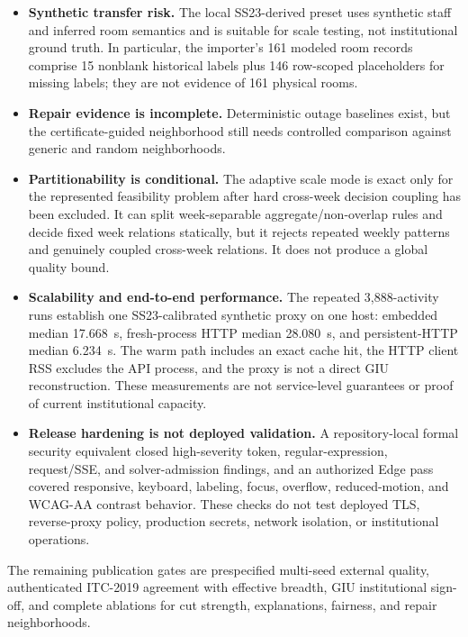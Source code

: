 \begin{itemize}[leftmargin=*]
  \item \textbf{Synthetic transfer risk.} The local SS23-derived preset uses synthetic staff and inferred room semantics and is suitable for scale testing, not institutional ground truth. In particular, the importer's 161 modeled room records comprise 15 nonblank historical labels plus 146 row-scoped placeholders for missing labels; they are not evidence of 161 physical rooms.
  \item \textbf{Repair evidence is incomplete.} Deterministic outage baselines exist, but the certificate-guided neighborhood still needs controlled comparison against generic and random neighborhoods.
  \item \textbf{Partitionability is conditional.} The adaptive scale mode is exact only for the represented feasibility problem after hard cross-week decision coupling has been excluded. It can split week-separable aggregate/non-overlap rules and decide fixed week relations statically, but it rejects repeated weekly patterns and genuinely coupled cross-week relations. It does not produce a global quality bound.
  \item \textbf{Scalability and end-to-end performance.} The repeated 3,888-activity runs establish one SS23-calibrated synthetic proxy on one host: embedded median 17.668~s, fresh-process HTTP median 28.080~s, and persistent-HTTP median 6.234~s. The warm path includes an exact cache hit, the HTTP client RSS excludes the API process, and the proxy is not a direct GIU reconstruction. These measurements are not service-level guarantees or proof of current institutional capacity.
  \item \textbf{Release hardening is not deployed validation.} A repository-local formal security equivalent closed high-severity token, regular-expression, request/SSE, and solver-admission findings, and an authorized Edge pass covered responsive, keyboard, labeling, focus, overflow, reduced-motion, and WCAG-AA contrast behavior. These checks do not test deployed TLS, reverse-proxy policy, production secrets, network isolation, or institutional operations.
\end{itemize}

The remaining publication gates are prespecified multi-seed external quality, authenticated ITC-2019 agreement with effective breadth, GIU institutional sign-off, and complete ablations for cut strength, explanations, fairness, and repair neighborhoods.
